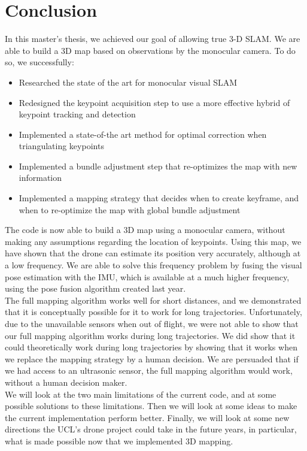 \chapter{Conclusion} %

In this master's thesis, we achieved our goal of allowing true 3-D SLAM. We are able to build a 3D map based on observations by the monocular camera. To do so, we successfully:
\begin{itemize}
\item Researched the state of the art for monocular visual SLAM
\item Redesigned the keypoint acquisition step to use a more effective hybrid of keypoint tracking and detection
\item Implemented a state-of-the art method for optimal correction when triangulating keypoints
\item Implemented a bundle adjustment step that re-optimizes the map with new information
\item Implemented a mapping strategy that decides when to create keyframe, and when to re-optimize the map with global bundle adjustment
\end{itemize}


The code is now able to build a 3D map using a monocular camera, without making any assumptions regarding the location of keypoints. Using this map, we have shown that the drone can estimate its position very accurately, although at a low frequency. We are able to solve this frequency problem by fusing the visual pose estimation with the IMU, which is available at a much higher frequency, using the pose fusion algorithm created last year.\\

The full mapping algorithm works well for short distances, and we demonstrated that it is conceptually possible for it to work for long trajectories. Unfortunately, due to the unavailable sensors when out of flight, we were not able to show that our full mapping algorithm works during long trajectories. We did show that it could theoretically work during long trajectories by showing that it works when we replace the mapping strategy by a human decision. We are persuaded that if we had access to an ultrasonic sensor, the full mapping algorithm would work, without a human decision maker.\\

We will look at the two main limitations of the current code, and at some possible solutions to these limitations. Then we will look at some ideas to make the current implementation perform better. Finally, we will look at some new directions the UCL's drone project could take in the future years, in particular, what is made possible now that we implemented 3D mapping.\\


